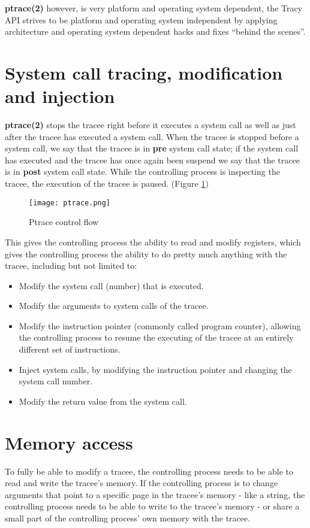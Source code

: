 \documentclass[a4paper, twoside, 10pt]{report}
\begin{document}
\textbf{ptrace(2)} however, is very platform and operating system dependent,
the Tracy API strives to be platform and operating system independent by
applying architecture and operating system dependent hacks and fixes
``behind the scenes''.

\section{System call tracing, modification and injection}

\textbf{ptrace(2)} stops the tracee right before it executes a system call as
well as just after the tracee has executed a system call. When the tracee
is stopped before a system call, we say that the tracee is in \textbf{pre}
system call state; if the system call has executed and the tracee has once again
been suspend we say that the tracee is in \textbf{post} system call state.
While the controlling process is inspecting the tracee, the execution of the
tracee is paused. (Figure \ref{fig1})


\begin{figure}
\label{fig1}
\texttt{[image: ptrace.png]}
\caption{Ptrace control flow}
\end{figure}

This gives the controlling process the ability to read and modify registers,
which gives the controlling process the ability to do pretty much anything
with the tracee, including but not limited to:

\begin{itemize}
\item Modify the system call (number) that is executed.
\item Modify the arguments to system calls of the tracee.
\item Modify the instruction pointer (commonly called program counter), allowing
    the controlling process to resume the executing of the tracee at an entirely
    different set of instructions.
\item Inject system calls, by modifying the instruction pointer and changing the
    system call number.
\item Modify the return value from the system call.
\end{itemize}

\section{Memory access}

To fully be able to modify a tracee, the controlling process needs to be able to
read and write the tracee's memory. If the controlling process is to change
arguments that point to a specific page in the tracee's memory - like a string,
the controlling process needs to be able to write to the tracee's memory - or
share a small part of the controlling process' own memory with the tracee.
\end{document}
